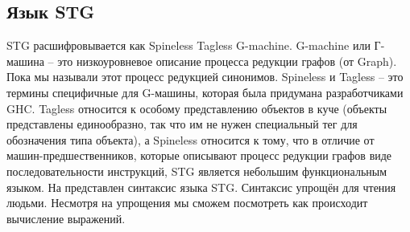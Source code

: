 \subsection{Язык STG}

STG расшифровывается как Spineless Tagless G-machine. 
G-machine или Г-машина -- это низкоуровневое описание 
процесса редукции графов (от Graph). Пока мы называли этот процесс
редукцией синонимов. Spineless и Tagless -- это термины специфичные
для G-машины, которая была придумана разработчиками GHC.
Tagless относится к особому представлению объектов в куче
(объекты представлены единообразно, так что им не нужен специальный
тег для обозначения типа объекта), а Spineless относится
к тому, что в отличие от машин-предшественников, которые
описывают процесс редукции графов виде последовательности
инструкций, STG является небольшим функциональным языком. 
На  представлен синтаксис языка STG. 
Синтаксис упрощён для чтения людьми. Несмотря на упрощения 
мы сможем посмотреть как происходит вычисление выражений. 
    
